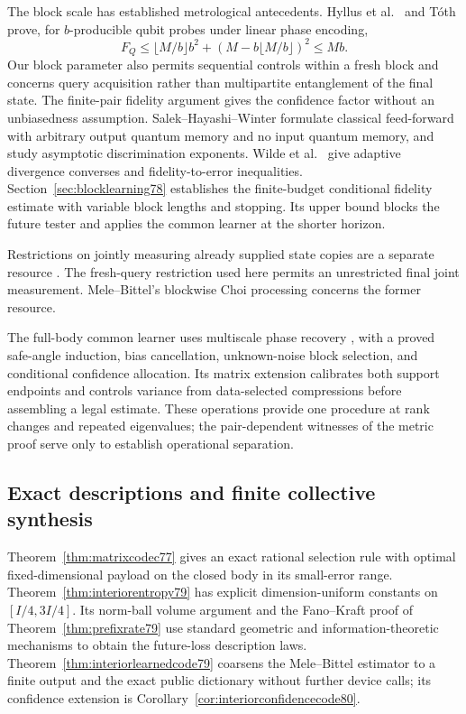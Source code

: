 The block scale has established metrological antecedents.
Hyllus et al.\ \cite[Observation~1, equation~(9)]{Hyllus78} and
T\'oth \cite[Observation~3, equation~(6)]{Toth78} prove, for
$b$-producible qubit probes under linear phase encoding,
\[
 F_Q\le\lfloor M/b\rfloor b^2+
              (M-b\lfloor M/b\rfloor)^2\le Mb.
\]
Our block parameter also permits sequential controls within a fresh
block and concerns query acquisition rather than multipartite
entanglement of the final state.  The finite-pair fidelity argument
gives the confidence factor without an unbiasedness assumption.
Salek--Hayashi--Winter \cite[Section~II.2 and Section~V.2]{SHW68}
formulate classical feed-forward with arbitrary output quantum
memory and no input quantum memory, and study asymptotic
discrimination exponents.  Wilde et al.\
\cite[Proposition~21 and Appendix~B]{WBHK72} give adaptive
divergence converses and fidelity-to-error inequalities.
Section~\ref{sec:blocklearning78} establishes the finite-budget
conditional fidelity estimate with variable block lengths and
stopping.  Its upper bound blocks the future tester and applies the
common learner at the shorter horizon.

Restrictions on jointly measuring already supplied state copies
are a separate resource \cite{CLL78,NZ78}.  The fresh-query
restriction used here permits an unrestricted final joint
measurement.  Mele--Bittel's blockwise Choi processing
\cite[Section~I.5]{MB67} concerns the former resource.

The full-body common learner uses multiscale phase recovery
\cite{HB76,KLY76}, with a proved safe-angle induction, bias
cancellation, unknown-noise block selection, and conditional
confidence allocation.  Its matrix extension calibrates both
support endpoints and controls variance from data-selected
compressions before assembling a legal estimate.  These operations
provide one procedure at rank changes and repeated eigenvalues;
the pair-dependent witnesses of the metric proof serve only to
establish operational separation.

\subsection{Exact descriptions and finite collective synthesis}
Theorem~\ref{thm:matrixcodec77} gives an exact rational selection
rule with optimal fixed-dimensional payload on the closed body
in its small-error range.  Theorem~\ref{thm:interiorentropy79}
has explicit dimension-uniform constants on $[I/4,3I/4]$.
Its norm-ball volume argument and the Fano--Kraft proof of
Theorem~\ref{thm:prefixrate79} use standard geometric and
information-theoretic mechanisms to obtain the future-loss
description laws.  Theorem~\ref{thm:interiorlearnedcode79}
coarsens the Mele--Bittel estimator to a finite output and the exact
public dictionary without further device calls; its confidence
extension is Corollary~\ref{cor:interiorconfidencecode80}.

